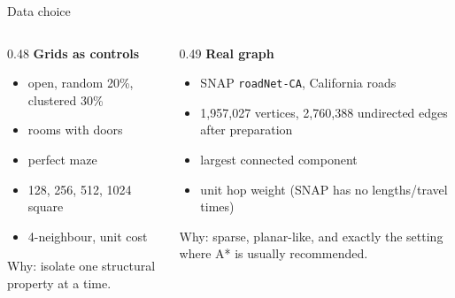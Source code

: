 \documentclass[aspectratio=169,10pt]{beamer}
\begin{document}
\begin{frame}{Data choice}
  \begin{columns}[T,onlytextwidth]
    \begin{column}{0.48\textwidth}
      \textbf{Grids as controls}
      \begin{itemize}
        \item open, random 20\%, clustered 30\%
        \item rooms with doors
        \item perfect maze
        \item 128, 256, 512, 1024 square
        \item 4-neighbour, unit cost
      \end{itemize}
      Why: isolate one structural property at a time.
    \end{column}
    \begin{column}{0.49\textwidth}
      \textbf{Real graph}
      \begin{itemize}
        \item SNAP \texttt{roadNet-CA}, California roads
        \item 1,957,027 vertices, 2,760,388 undirected edges after preparation
        \item largest connected component
        \item unit hop weight (SNAP has no lengths/travel times)
      \end{itemize}
      Why: sparse, planar-like, and exactly the setting where A* is usually
      recommended.
    \end{column}
  \end{columns}
\end{frame}
\end{document}
